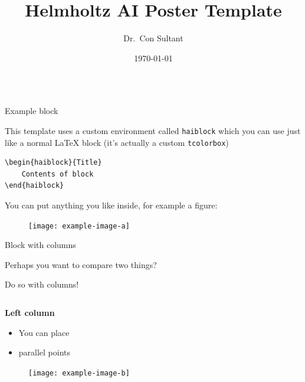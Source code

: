 \documentclass[aspectratio=1610]{beamer}
\title{Helmholtz AI Poster Template}
\author{Dr.\ Con Sultant}
\institute[Helmholtz AI]
  {Helmholtz AI, Germany}
\date{\today}
\begin{document}
\begin{frame}[fragile]{}
    \vspace{-3ex}
    
    \begin{columns}[t]
        \begin{column}{.5\linewidth}
        
            \begin{haiblock}{Example block}

                This template uses a custom environment called
                \texttt{haiblock} which you can use just like a normal LaTeX block
                (it's actually a custom \texttt{tcolorbox})

                \begin{verbatim}
\begin{haiblock}{Title}
    Contents of block
\end{haiblock}
                \end{verbatim}


                You can put anything you like inside, for example a figure:
                \begin{figure}
                    \centering
                    \texttt{[image: example-image-a]}
                \end{figure}
                
            \end{haiblock}
            
            \begin{haiblock}{Block with columns}

            Perhaps you want to compare two things?

            Do so with columns!

            \begin{columns}[t]
                \begin{column}{0.5\linewidth}

                    \textbf{Left column}
                    \begin{itemize}
                        \item You can place
                        \item parallel points
                    \end{itemize}

                    \begin{figure}[b]
                        \centering
                        \texttt{[image: example-image-b]}%
                    \end{figure}
                \end{column}%
                \begin{column}{0.5\linewidth}


\end{column}
\end{columns}
\end{haiblock}
\end{column}
\end{columns}
\end{frame}
\end{document}
